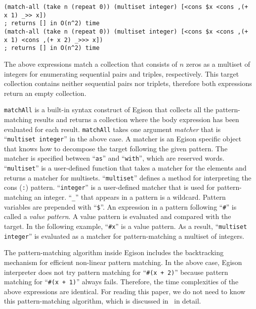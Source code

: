 \documentclass{article}
\begin{document}
\begin{lstlisting}[language=egison]
(match-all (take n (repeat 0)) (multiset integer) [<cons $x <cons ,(+ x 1) _>> x])
; returns [] in O(n^2) time
(match-all (take n (repeat 0)) (multiset integer) [<cons $x <cons ,(+ x 1) <cons ,(+ x 2) _>>> x])
; returns [] in O(n^2) time
\end{lstlisting}

The above expressions match a collection that consists of $n$ zeros as a multiset of integers for enumerating sequential pairs and triples, respectively.
This target collection contains neither sequential pairs nor triplets, therefore both expressions return an empty collection.

\texttt{matchAll} is a built-in syntax construct of Egison that collects all the pattern-matching results and returns a collection where the body expression has been evaluated for each result.
\texttt{matchAll} takes one argument \emph{matcher} that is ``\texttt{multiset integer}'' in the above case.
A matcher is an Egison specific object that knows how to decompose the target following the given pattern.
The matcher is specified between ``\texttt{as}'' and ``\texttt{with}'', which are reserved words.
``\texttt{multiset}'' is a user-defined function that takes a matcher for the elements and returns a matcher for multisets.
``\texttt{multiset}'' defines a method for interpreting the cons (\texttt{:}) pattern.
``\texttt{integer}'' is a user-defined matcher that is used for pattern-matching an integer.
``\verb|_|'' that appears in a pattern is a wildcard.
Pattern variables are prepended with ``\verb|$|''.
An expression in a pattern following ``\verb|#|'' is called a \emph{value pattern}.
A value pattern is evaluated and compared with the target.
In the following example, ``\verb|#x|'' is a value pattern.
As a result, ``\texttt{multiset integer}'' is evaluated as a matcher for pattern-matching a multiset of integers.

The pattern-matching algorithm inside Egison includes the backtracking mechanism for efficient non-linear pattern matching.
In the above case, Egison interpreter does not try pattern matching for ``\verb|#(x + 2)|'' because pattern matching for ``\verb|#(x + 1)|'' always fails.
Therefore, the time complexities of the above expressions are identical.
For reading this paper, we do not need to know this pattern-matching algorithm, which is discussed in~\cite{egi2018Aplas} in detail.
\end{document}
